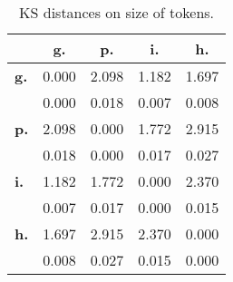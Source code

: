 \begin{table}[h!]
\begin{center}
\begin{tabular}{| l || c | c | c | c |}\hline
 & {\bf g.} & {\bf p.} & {\bf i.} & {\bf h.} \\\hline\hline
{\bf g.} & 0.000 & 2.098 & 1.182 & 1.697 \\
{\bf } & 0.000 & 0.018 & 0.007 & 0.008 \\\hline
{\bf p.} & 2.098 & 0.000 & 1.772 & 2.915 \\
{\bf } & 0.018 & 0.000 & 0.017 & 0.027 \\\hline
{\bf i.} & 1.182 & 1.772 & 0.000 & 2.370 \\
{\bf } & 0.007 & 0.017 & 0.000 & 0.015 \\\hline
{\bf h.} & 1.697 & 2.915 & 2.370 & 0.000 \\
{\bf } & 0.008 & 0.027 & 0.015 & 0.000 \\\hline
\end{tabular}
\caption{KS distances on size of tokens.}
\end{center}
\end{table}